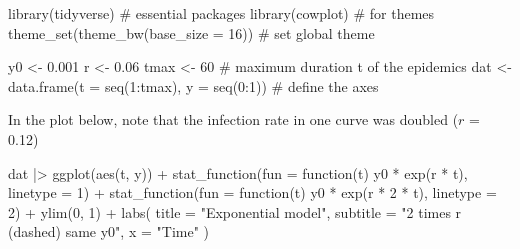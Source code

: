 \documentclass[
  letterpaper,
  DIV=11,
  numbers=noendperiod]{scrreprt}
\newenvironment{Shaded}{\begin{snugshade}}{\end{snugshade}}
\newcommand{\AttributeTok}[1]{\textcolor[rgb]{0.40,0.45,0.13}{#1}}
\newcommand{\CommentTok}[1]{\textcolor[rgb]{0.37,0.37,0.37}{#1}}
\newcommand{\ControlFlowTok}[1]{\textcolor[rgb]{0.00,0.23,0.31}{#1}}
\newcommand{\DecValTok}[1]{\textcolor[rgb]{0.68,0.00,0.00}{#1}}
\newcommand{\FloatTok}[1]{\textcolor[rgb]{0.68,0.00,0.00}{#1}}
\newcommand{\FunctionTok}[1]{\textcolor[rgb]{0.28,0.35,0.67}{#1}}
\newcommand{\NormalTok}[1]{\textcolor[rgb]{0.00,0.23,0.31}{#1}}
\newcommand{\OtherTok}[1]{\textcolor[rgb]{0.00,0.23,0.31}{#1}}
\newcommand{\SpecialCharTok}[1]{\textcolor[rgb]{0.37,0.37,0.37}{#1}}
\newcommand{\StringTok}[1]{\textcolor[rgb]{0.13,0.47,0.30}{#1}}
\begin{document}
\begin{Shaded}
\begin{Highlighting}[]
\FunctionTok{library}\NormalTok{(tidyverse) }\CommentTok{\# essential packages }
\FunctionTok{library}\NormalTok{(cowplot) }\CommentTok{\# for themes }
\FunctionTok{theme\_set}\NormalTok{(}\FunctionTok{theme\_bw}\NormalTok{(}\AttributeTok{base\_size =} \DecValTok{16}\NormalTok{)) }\CommentTok{\# set global theme}
\end{Highlighting}
\end{Shaded}

\begin{Shaded}
\begin{Highlighting}[]
\NormalTok{y0 }\OtherTok{\textless{}{-}} \FloatTok{0.001} 
\NormalTok{r }\OtherTok{\textless{}{-}} \FloatTok{0.06} 
\NormalTok{tmax }\OtherTok{\textless{}{-}} \DecValTok{60} \CommentTok{\# maximum duration t of the epidemics}
\NormalTok{dat }\OtherTok{\textless{}{-}} \FunctionTok{data.frame}\NormalTok{(}\AttributeTok{t =} \FunctionTok{seq}\NormalTok{(}\DecValTok{1}\SpecialCharTok{:}\NormalTok{tmax), }\AttributeTok{y =} \FunctionTok{seq}\NormalTok{(}\DecValTok{0}\SpecialCharTok{:}\DecValTok{1}\NormalTok{)) }\CommentTok{\# define the axes}
\end{Highlighting}
\end{Shaded}

In the plot below, note that the infection rate in one curve was doubled
(\(r\) = 0.12)

\begin{Shaded}
\begin{Highlighting}[]
\NormalTok{dat }\SpecialCharTok{|\textgreater{}}
  \FunctionTok{ggplot}\NormalTok{(}\FunctionTok{aes}\NormalTok{(t, y)) }\SpecialCharTok{+}
  \FunctionTok{stat\_function}\NormalTok{(}\AttributeTok{fun =} \ControlFlowTok{function}\NormalTok{(t) y0 }\SpecialCharTok{*} \FunctionTok{exp}\NormalTok{(r }\SpecialCharTok{*}\NormalTok{ t), }\AttributeTok{linetype =} \DecValTok{1}\NormalTok{) }\SpecialCharTok{+}
  \FunctionTok{stat\_function}\NormalTok{(}\AttributeTok{fun =} \ControlFlowTok{function}\NormalTok{(t) y0 }\SpecialCharTok{*} \FunctionTok{exp}\NormalTok{(r }\SpecialCharTok{*} \DecValTok{2} \SpecialCharTok{*}\NormalTok{ t), }\AttributeTok{linetype =} \DecValTok{2}\NormalTok{) }\SpecialCharTok{+}
  \FunctionTok{ylim}\NormalTok{(}\DecValTok{0}\NormalTok{, }\DecValTok{1}\NormalTok{) }\SpecialCharTok{+}
  \FunctionTok{labs}\NormalTok{(}
    \AttributeTok{title =} \StringTok{"Exponential model"}\NormalTok{,}
    \AttributeTok{subtitle =} \StringTok{"2 times r (dashed) same y0"}\NormalTok{,}
    \AttributeTok{x =} \StringTok{"Time"}
\NormalTok{  )}
\end{Highlighting}
\end{Shaded}
\end{document}
